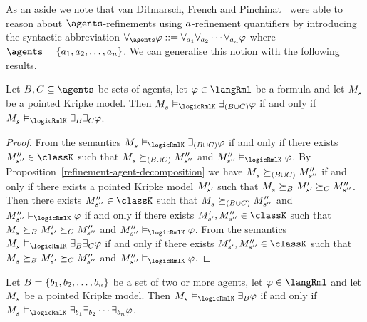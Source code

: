 As an aside we note that van Ditmarsch, French and Pinchinat~\cite{vanditmarsch:2010} were able to reason about $\agents$-refinements using $a$-refinement quantifiers by introducing the syntactic abbreviation $\allrefsAs \phi ::= \allrefs[\agentA_1] \allrefs[\agentA_2] \cdots \allrefs[\agentA_n] \phi$ where $\agents = \{\agentA_1, \agentA_2, \dots, \agentA_n\}$.
We can generalise this notion with the following results.

\begin{proposition}\label{rml-agent-decomposition}
Let $\agentsB, \agentsC \subseteq \agents$ be sets of agents, let $\phi \in \langRml$ be a formula and let $\kPModel{\kStateS}$ be a pointed Kripke model.
Then $\kPModel{\kStateS} \entails_\logicRmlK \somerefs[(\agentsB \cup \agentsC)] \phi$ if and only if $\kPModel{\kStateS} \entails_\logicRmlK \somerefsBs \somerefsCs \phi$.
\end{proposition}

\begin{proof}
From the semantics $\kPModel{\kStateS} \entails_\logicRmlK \somerefs[(\agentsB \cup \agentsC)] \phi$ if and only if there exists $\kPModelPP{\kStateSPP} \in \classK$ such that $\kPModel{\kStateS} \simulates[(\agentsB \cup \agentsC)] \kPModelPP{\kStateSPP}$ and $\kPModelPP{\kStateSPP} \entails_\logicRmlK \phi$.
By Proposition~\ref{refinement-agent-decomposition} we have $\kPModel{\kStateS} \simulates[(\agentsB \cup \agentsC)] \kPModelPP{\kStateSPP}$ if and only if there exists a pointed Kripke model ${M^{\prime}_{{s}^{\prime}}}$ such that $\kPModel{\kStateS} \simulatesBs \kPModelP{\kStateSP} \simulatesCs \kPModelPP{\kStateSPP}$.
Then there exists $\kPModelPP{\kStateSPP} \in \classK$ such that $\kPModel{\kStateS} \simulates[(\agentsB \cup \agentsC)] \kPModelPP{\kStateSPP}$ and $\kPModelPP{\kStateSPP} \entails_\logicRmlK \phi$
if and only if
there exists $\kPModelP{\kStateSP}, \kPModelPP{\kStateSPP} \in \classK$ such that $\kPModel{\kStateS} \simulatesBs \kPModelP{\kStateSP} \simulatesCs \kPModelPP{\kStateSPP}$ and $\kPModelPP{\kStateSPP} \entails_\logicRmlK \phi$.
From the semantics $\kPModel{\kStateS} \entails_\logicRmlK \somerefsBs \somerefsCs \phi$ if and only if there exists $\kPModelP{\kStateSP}, \kPModelPP{\kStateSPP} \in \classK$ such that $\kPModel{\kStateS} \simulatesBs \kPModelP{\kStateSP} \simulatesCs \kPModelPP{\kStateSPP}$ and $\kPModelPP{\kStateSPP} \entails_\logicRmlK \phi$.
\end{proof}

\begin{corollary}
Let $B = \{b_1, b_2, \dots, b_n\}$ be a set of two or more agents, let $\phi \in \langRml$ and let $\kPModel{\kStateS}$ be a pointed Kripke model.
Then $\kPModel{\kStateS} \entails_\logicRmlK \somerefsBs \phi$ if and only if $\kPModel{\kStateS} \entails_\logicRmlK \somerefs[\agentB_1] \somerefs[\agentB_2] \cdots \somerefs[\agentB_n] \phi$.
\end{corollary}

